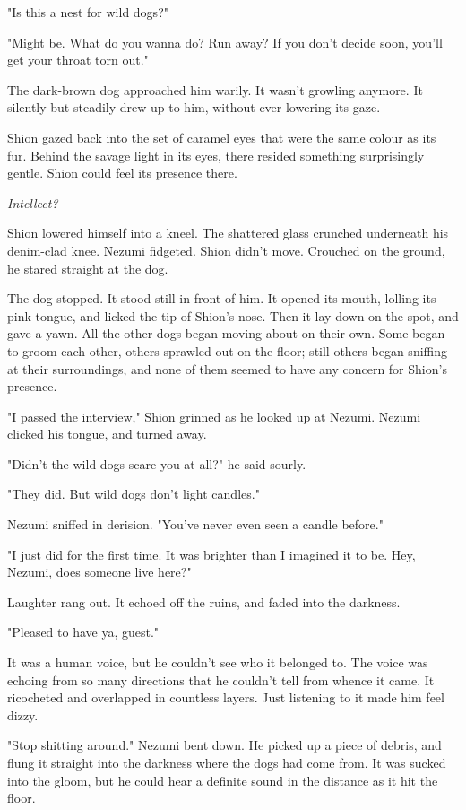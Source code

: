 "Is this a nest for wild dogs?"

"Might be. What do you wanna do? Run away? If you don't decide soon,
you'll get your throat torn out."

The dark-brown dog approached him warily. It wasn't growling anymore. It
silently but steadily drew up to him, without ever lowering its gaze.

Shion gazed back into the set of caramel eyes that were the same colour
as its fur. Behind the savage light in its eyes, there resided something
surprisingly gentle. Shion could feel its presence there.

\emph{Intellect?}

Shion lowered himself into a kneel. The shattered glass crunched
underneath his denim-clad knee. Nezumi fidgeted. Shion didn't move.
Crouched on the ground, he stared straight at the dog.

The dog stopped. It stood still in front of him. It opened its mouth,
lolling its pink tongue, and licked the tip of Shion's nose. Then it lay
down on the spot, and gave a yawn. All the other dogs began moving about
on their own. Some began to groom each other, others sprawled out on the
floor; still others began sniffing at their surroundings, and none of
them seemed to have any concern for Shion's presence.

"I passed the interview," Shion grinned as he looked up at Nezumi.
Nezumi clicked his tongue, and turned away.

"Didn't the wild dogs scare you at all?" he said sourly.

"They did. But wild dogs don't light candles."

Nezumi sniffed in derision. "You've never even seen a candle before."

"I just did for the first time. It was brighter than I imagined it to
be. Hey, Nezumi, does someone live here?"

Laughter rang out. It echoed off the ruins, and faded into the darkness.

"Pleased to have ya, guest."

It was a human voice, but he couldn't see who it belonged to. The voice
was echoing from so many directions that he couldn't tell from whence it
came. It ricocheted and overlapped in countless layers. Just listening
to it made him feel dizzy.

"Stop shitting around." Nezumi bent down. He picked up a piece of
debris, and flung it straight into the darkness where the dogs had come
from. It was sucked into the gloom, but he could hear a definite sound
in the distance as it hit the floor.

